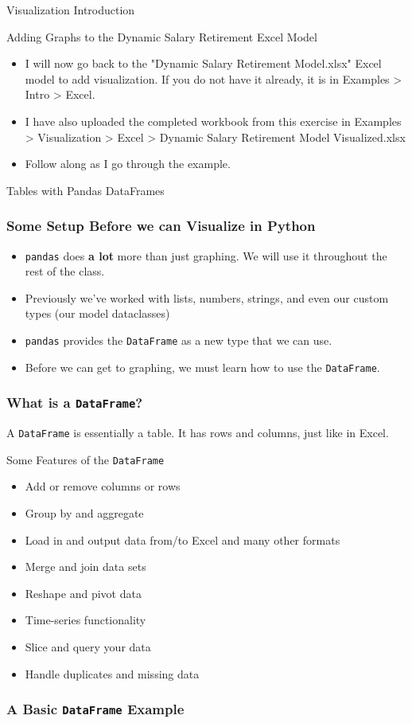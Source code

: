 \documentclass[handout, 11pt]{beamer}
\begin{document}
\begin{section}[Intro]{Visualization Introduction}
\begin{frame}
{\begin{block}{Adding Graphs to the Dynamic Salary Retirement Excel Model}
\begin{itemize}
\item I will now go back to the "Dynamic Salary Retirement Model.xlsx" Excel model to add visualization. If you do not have it already, it is in Examples > Intro > Excel. 
\item I have also uploaded the completed workbook from this exercise in Examples > Visualization > Excel > Dynamic Salary Retirement Model Visualized.xlsx
\item Follow along as I go through the example.
\end{itemize}
\end{block}
}
\end{frame}
\end{section}
\begin{section}[Pandas]{Tables with Pandas DataFrames}
\begin{frame}
\frametitle{Some Setup Before we can Visualize in Python}
\begin{itemize}
\item \texttt{pandas}
does
\textbf{a lot}
more than just graphing. We will use it throughout the rest of the class.
\vfill
\item Previously we've worked with lists, numbers, strings, and even our custom types (our model dataclasses)
\vfill
\item \texttt{pandas}
provides the
\texttt{DataFrame}
as a new type that we can use.
\vfill
\item Before we can get to graphing, we must learn how to use the \texttt{DataFrame}.
\end{itemize}
\end{frame}
\begin{frame}
\frametitle{What is a \texttt{DataFrame}?}
A
\texttt{DataFrame}
is essentially a table. It has rows and columns, just like in Excel.
\vfill
\begin{block}{Some Features of the \texttt{DataFrame}}
\begin{itemize}
\item Add or remove columns or rows
\item Group by and aggregate
\item Load in and output data from/to Excel and many other formats
\item Merge and join data sets
\item Reshape and pivot data
\item Time-series functionality
\item Slice and query your data
\item Handle duplicates and missing data
\end{itemize}
\end{block}
\end{frame}
\begin{frame}[fragile]
\frametitle{A Basic \texttt{DataFrame} Example}
\begin{verbatim}


\end{verbatim}
\end{frame}
\end{section}
\end{document}
